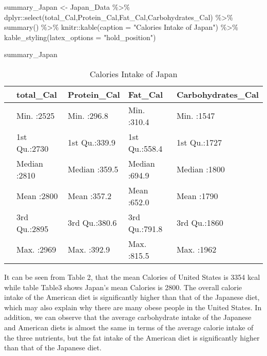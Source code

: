 \documentclass[11pt,a4paper,]{article}
\newenvironment{Shaded}{\begin{snugshade}}{\end{snugshade}}
\newcommand{\AttributeTok}[1]{\textcolor[rgb]{0.77,0.63,0.00}{#1}}
\newcommand{\FunctionTok}[1]{\textcolor[rgb]{0.00,0.00,0.00}{#1}}
\newcommand{\NormalTok}[1]{#1}
\newcommand{\OtherTok}[1]{\textcolor[rgb]{0.56,0.35,0.01}{#1}}
\newcommand{\SpecialCharTok}[1]{\textcolor[rgb]{0.00,0.00,0.00}{#1}}
\newcommand{\StringTok}[1]{\textcolor[rgb]{0.31,0.60,0.02}{#1}}
\begin{document}
\begin{Shaded}
\begin{Highlighting}[]
\NormalTok{summary\_Japan }\OtherTok{\textless{}{-}}\NormalTok{ Japan\_Data }\SpecialCharTok{\%\textgreater{}\%} 
\NormalTok{  dplyr}\SpecialCharTok{::}\FunctionTok{select}\NormalTok{(total\_Cal,Protein\_Cal,Fat\_Cal,Carbohydrates\_Cal) }\SpecialCharTok{\%\textgreater{}\%}
  \FunctionTok{summary}\NormalTok{() }\SpecialCharTok{\%\textgreater{}\%} 
\NormalTok{  knitr}\SpecialCharTok{::}\FunctionTok{kable}\NormalTok{(}\AttributeTok{caption =} \StringTok{"Calories Intake of Japan"}\NormalTok{) }\SpecialCharTok{\%\textgreater{}\%} 
         \FunctionTok{kable\_styling}\NormalTok{(}\AttributeTok{latex\_options =} \StringTok{"hold\_position"}\NormalTok{)}

\NormalTok{summary\_Japan}
\end{Highlighting}
\end{Shaded}

\begin{table}[!h]

\caption{\label{tab:Japan}Calories Intake of Japan}
\centering
\begin{tabular}[t]{l|l|l|l|l}
\hline
  &   total\_Cal &  Protein\_Cal &    Fat\_Cal & Carbohydrates\_Cal\\
\hline
 & Min.   :2525 & Min.   :296.8 & Min.   :310.4 & Min.   :1547\\
\hline
 & 1st Qu.:2730 & 1st Qu.:339.9 & 1st Qu.:558.4 & 1st Qu.:1727\\
\hline
 & Median :2810 & Median :359.5 & Median :694.9 & Median :1800\\
\hline
 & Mean   :2800 & Mean   :357.2 & Mean   :652.0 & Mean   :1790\\
\hline
 & 3rd Qu.:2895 & 3rd Qu.:380.6 & 3rd Qu.:791.8 & 3rd Qu.:1860\\
\hline
 & Max.   :2969 & Max.   :392.9 & Max.   :815.5 & Max.   :1962\\
\hline
\end{tabular}
\end{table}

It can be seen from Table 2, that the mean Calories of United States is 3354 kcal while table Table3 shows Japan's mean Calories is 2800.
The overall calorie intake of the American diet is significantly higher than that of the Japanese diet, which may also explain why there are many obese people in the United States.
In addition, we can observe that the average carbohydrate intake of the Japanese and American diets is almost the same in terms of the average calorie intake of the three nutrients, but the fat intake of the American diet is significantly higher than that of the Japanese diet.
\end{document}
